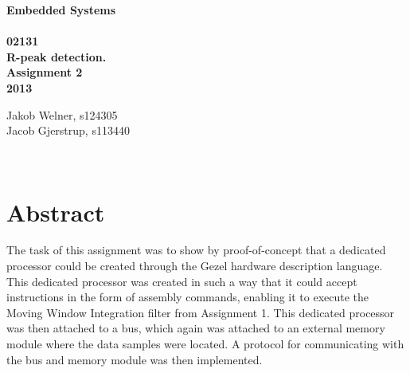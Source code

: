 \documentclass[12pt,a4paper]{article}
\begin{document}
\begin{titlepage}
	\begin{center}
		\vspace*{13\baselineskip}
		\huge
		\bfseries
		Embedded Systems\\ 
		\ \\
		02131 \\[5\baselineskip]

		\normalfont
		\Large
		R-peak detection. \\
		Assignment 2\\	
		2013

		\small
		\vfill
	\end{center}	
	\begin{flushleft}
		Jakob Welner, s124305\\
	 	Jacob Gjerstrup, s113440\\
	\end{flushleft}
\end{titlepage}

\ \\
\section*{Abstract}
The task of this assignment was to show by proof-of-concept that a dedicated processor could be created through the Gezel hardware description language. This dedicated processor was created in such a way that it could accept instructions in the form of assembly commands, enabling it to execute the Moving Window Integration filter from Assignment 1. This dedicated processor was then attached to a bus, which again was attached to an external memory module where the data samples were located. A protocol for communicating with the bus and memory module was then implemented.

\thispagestyle{empty} 
\newpage

\tableofcontents
\thispagestyle{empty} 
\newpage

\setcounter{page}{1}

\ \\
\end{document}
